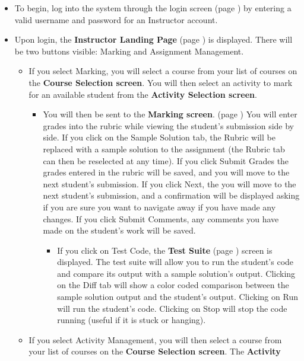 \documentclass{article}
\begin{document}
\begin{itemize}
	\item To begin, log into the system through the login screen (page \pageref{login})
		by entering a valid username and password for an Instructor account.
	\item Upon login, the \textbf{Instructor Landing Page} (page \pageref{landPg}) 
		is displayed. There will be two buttons visible: Marking and Assignment 
		Management.
	\begin{itemize}
		\item If you select Marking, you will select a course from your list of courses
			on the \textbf{Course Selection screen}. You will then select an activity
			to mark for an available student from the \textbf{Activity Selection screen}.
		\begin{itemize}
			\item You will then be sent to the \textbf{Marking screen}. (page
				\pageref{marking}) You will enter grades into the rubric while viewing 
				the student's submission side by side. If you click on the Sample Solution 
				tab, the Rubric will be replaced with a sample solution to the assignment 
				(the Rubric tab can then be reselected at any time). If you click Submit 
				Grades the grades entered in the rubric will be saved, and you will 
				move to the next student's submission. If you click Next, the you will 
				move to the next student's submission, and a confirmation will be displayed 
				asking if you are sure you want to navigate away if you have made any 
				changes. If you click Submit Comments, any comments you have made 
				on the student's work will be saved.
			\begin{itemize}
				\item If you click on Test Code, the \textbf{Test Suite} (page 
					\pageref{testSuite}) screen is displayed. The test suite will allow you 
					to run the student's code and compare its output with a sample 
					solution's output. Clicking on the Diff tab will show a color coded 
					comparison between the sample solution output and the student's 
					output. Clicking on Run will run the student's code. Clicking on Stop 
					will stop the code running (useful if it is stuck or hanging).
			\end{itemize}
		\end{itemize}
		\item If you select Activity Management, you will then select a course from your
			list of courses on the \textbf{Course Selection screen}. The \textbf{Activity 
}
\end{itemize}
\end{itemize}
\end{document}
